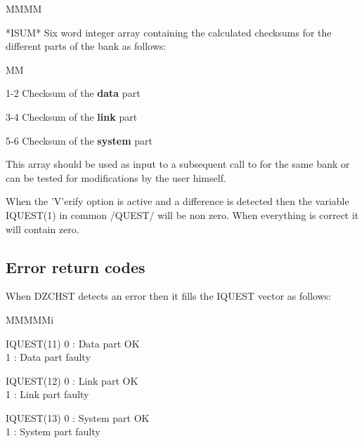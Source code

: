 \Odesc
\begin{DL}{MMMM}
\item[*ISUM*]Six word integer array containing the calculated
checksums for the different parts of the bank as follows:
\begin{DL}{MM}
\item[1-2]Checksum of the {\bf data} part
\item[3-4]Checksum of the {\bf link} part
\item[5-6]Checksum of the {\bf system} part
\end{DL}
This array should be used as input to a subsequent call to 
for the same bank or can be tested for modifications by the
user himself.
\end{DL}
\par
When the 'V'erify option is active and a difference is detected
then the variable IQUEST(1) in common /QUEST/
will be non zero. When everything is correct it will contain zero.
\subsection{Error return codes}
\par
When DZCHST detects an error then it fills the IQUEST vector as follows:
\begin{DL}{MMMMMi}
\item[IQUEST(11)]0 : Data part OK\\1 : Data part faulty
\item[IQUEST(12)]0 : Link part OK\\1 : Link part faulty
\item[IQUEST(13)]0 : System part OK\\1 : System part faulty
\end{DL}
